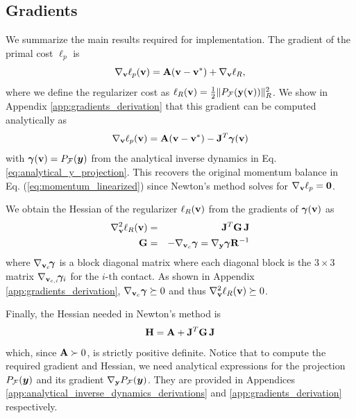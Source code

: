 \subsection{Gradients}
\label{sec:gradients}


We summarize the main results required for implementation. The gradient of the
primal cost $\ell_p$ is
\begin{equation*}
	\nabla_{\mathbf{v}}\ell_p({\mathbf{v}}) = {\mathbf{A}}({\mathbf{v}}-{\mathbf{v}}^*) + \nabla_{\mathbf{v}}\ell_R,
\end{equation*}
where we define the regularizer cost as $\ell_R({\mathbf{v}})=\frac{1}{2}\Vert
P_\mathcal{F}({\mathbf{y}}({\mathbf{v}}))\Vert_R^2$. We show in Appendix
\ref{app:gradients_derivation} that this gradient can be computed analytically as
\begin{equation}
	\nabla_\mf{v}\ell_p(\mf{v}) = \mf{A}(\mf{v}-\mf{v}^*) - \mf{J}^T\bgamma(\mf{v})
	\label{eq:primal_gradient}
\end{equation}
with ${\bm\gamma}({\mathbf{v}})=P_\mathcal{F}({\bm{y}})$ from the analytical inverse
dynamics in Eq. \eqref{eq:analytical_y_projection}. This recovers the original
momentum balance in Eq. (\ref{eq:momentum_linearized}) since Newton's method
solves for $\nabla_{\mathbf{v}}\ell_p={\mathbf{0}}$.

We obtain the Hessian of the regularizer $\ell_R({\mathbf{v}})$ from the
gradients of ${\bm\gamma}({\mathbf{v}})$ as
\begin{eqnarray}
	\nabla_\mf{v}^2\ell_R(\mf{v}) &=& \mf{J}^T\mf{G}\,\mf{J}\nonumber\\
	\mf{G} &=&-\nabla_{\mf{v}_c}\bgamma = \nabla_\mf{y}\bgamma \mf{R}^{-1}
	\label{eq:ellR_hessian}
\end{eqnarray}
where $\nabla_{{\mathbf{v}}_c}\!{\bm\gamma}$ is a block diagonal matrix where each
diagonal block is the $3\times 3$ matrix $\nabla_{{\mathbf{v}}_{c,i}}\!{\bm\gamma}_i$
for the $i\text{-th}$ contact. As shown in Appendix
\ref{app:gradients_derivation}, $\nabla_{{\mathbf{v}}_c}{\bm\gamma}\succeq 0$ and thus
$\nabla_{\mathbf{v}}^2\ell_R({\mathbf{v}})\succeq 0$.

Finally, the Hessian needed in Newton's method is
\begin{equation}
	\mf{H}= \mf{A} + \mf{J}^T\mf{G}\,\mf{J}
	\label{eq:ell_hessian}
\end{equation}
which, since ${\mathbf{A}}\succ 0$, is strictly positive definite. Notice
that to compute the required gradient and Hessian, we need analytical expressions
for the projection $P_\mathcal{F}({\bm{y}})$ and its gradient
$\nabla_{\mathbf{y}}P_\mathcal{F}({\bm{y}})$. They are provided in Appendices
\ref{app:analytical_inverse_dynamics_derivations} and
\ref{app:gradients_derivation} respectively.

